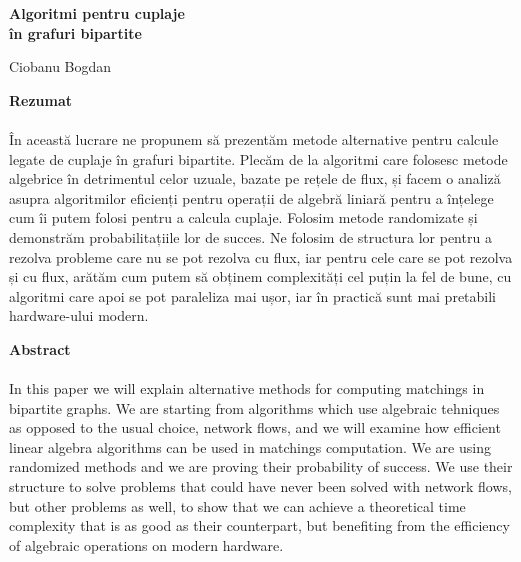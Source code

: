 \thispagestyle{empty}
\begin{center}
    \Large
    \textbf{Algoritmi pentru cuplaje \\ în grafuri bipartite}

    \vspace{0.4cm}
    {Ciobanu Bogdan}

    \vspace{0.9cm}
    \textbf{Rezumat}

\end{center}
\onehalfspacing
\paragraph{}
În această lucrare ne propunem să prezentăm metode alternative pentru calcule
legate de cuplaje în grafuri bipartite. Plecăm de la algoritmi care folosesc
metode algebrice în detrimentul celor uzuale, bazate pe rețele de flux, și
facem o analiză asupra algoritmilor eficienți pentru operații de algebră
liniară pentru a înțelege cum îi putem folosi pentru a calcula cuplaje.
Folosim metode randomizate și demonstrăm probabilitațiile lor de succes.
Ne folosim de structura lor pentru a rezolva probleme care nu se pot rezolva
cu flux, iar pentru cele care se pot rezolva și cu flux, arătăm cum putem să
obținem complexități cel puțin la fel de bune, cu algoritmi care apoi se pot
paraleliza mai ușor, iar în practică sunt mai pretabili hardware-ului modern.

\begin{center}
    \Large
    \vspace{0.9cm}
    \textbf{Abstract}
\end{center}
\onehalfspacing
\paragraph{}
In this paper we will explain alternative methods for computing matchings in
bipartite graphs. We are starting from algorithms which use algebraic tehniques
as opposed to the usual choice, network flows, and we will examine how efficient
linear algebra algorithms can be used in matchings computation. We are using
randomized methods and we are proving their probability of success. We use their
structure to solve problems that could have never been solved with network flows,
but other problems as well, to show that we can achieve a theoretical time
complexity that is as good as their counterpart, but benefiting from the
efficiency of algebraic operations on modern hardware.
